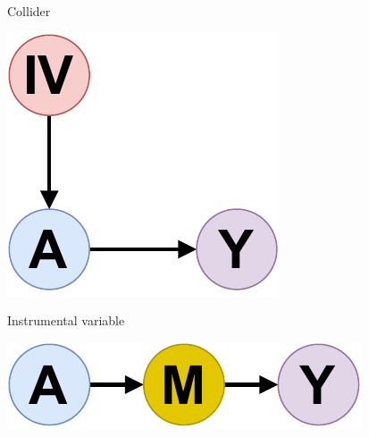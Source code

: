 \documentclass[french,12pt,twoside,a4paper]{book}
\begin{document}
\begin{figure}
\begin{minipage}[t]{0.18\linewidth}
    \small\sffamily Collider
  \end{minipage}
  \hfill
  \begin{minipage}[t]{0.18\linewidth}
    \includegraphics[width=0.72\linewidth]{img/chapter_4/instrumental_variable.pdf}

    \small\sffamily Instrumental variable
  \end{minipage}
  \hfill
  \begin{minipage}[t]{0.18\linewidth}
    \includegraphics[width=.9\linewidth]{img/chapter_4/mediator.pdf}%


\end{minipage}
\end{figure}
\end{document}
